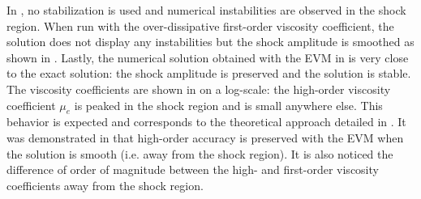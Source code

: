 In , no stabilization  is used and numerical instabilities are observed in the shock region. When run with the over-dissipative first-order viscosity coefficient, the solution does not display any instabilities but the shock amplitude is smoothed as shown in . Lastly, the numerical solution obtained with the EVM in  is very close to the exact solution: the shock amplitude is preserved and the solution is stable. The viscosity coefficients are shown in  on a log-scale: the high-order viscosity coefficient $\mu_e$ is peaked in the shock region and is small anywhere else. This behavior is expected and corresponds to the theoretical approach detailed in . It was demonstrated in \cite{valentin} that high-order accuracy is preserved with the EVM when the solution is smooth (i.e. away from the shock region). It is also noticed the difference of order of magnitude between the high- and first-order viscosity coefficients away from the shock region.
